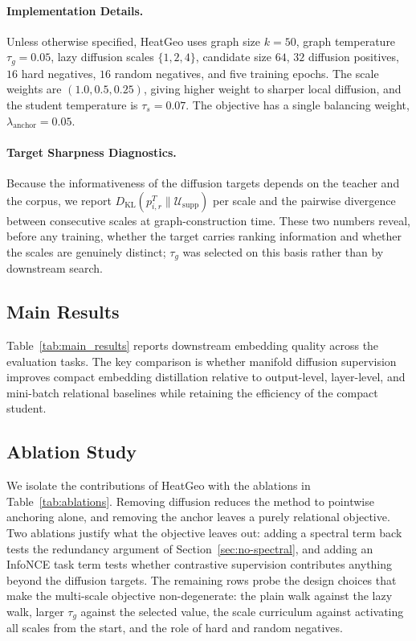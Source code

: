 \paragraph{Implementation Details.}
Unless otherwise specified, HeatGeo uses graph size $k=50$, graph temperature $\tau_g=0.05$, lazy diffusion scales $\{1,2,4\}$, candidate size $64$, $32$ diffusion positives, $16$ hard negatives, $16$ random negatives, and five training epochs. The scale weights are $(1.0,0.5,0.25)$, giving higher weight to sharper local diffusion, and the student temperature is $\tau_s=0.07$. The objective has a single balancing weight, $\lambda_{\mathrm{anchor}}=0.05$.

\paragraph{Target Sharpness Diagnostics.}
Because the informativeness of the diffusion targets depends on the teacher and the corpus, we report $D_{\mathrm{KL}}(p_{i,r}^T\|\mathcal{U}_{\mathrm{supp}})$ per scale and the pairwise divergence between consecutive scales at graph-construction time. These two numbers reveal, before any training, whether the target carries ranking information and whether the scales are genuinely distinct; $\tau_g$ was selected on this basis rather than by downstream search.

\subsection{Main Results}

Table~\ref{tab:main_results} reports downstream embedding quality across the evaluation tasks. The key comparison is whether manifold diffusion supervision improves compact embedding distillation relative to output-level, layer-level, and mini-batch relational baselines while retaining the efficiency of the compact student.



\subsection{Ablation Study}

We isolate the contributions of HeatGeo with the ablations in Table~\ref{tab:ablations}. Removing diffusion reduces the method to pointwise anchoring alone, and removing the anchor leaves a purely relational objective. Two ablations justify what the objective leaves out: adding a spectral term back tests the redundancy argument of Section~\ref{sec:no-spectral}, and adding an InfoNCE task term tests whether contrastive supervision contributes anything beyond the diffusion targets. The remaining rows probe the design choices that make the multi-scale objective non-degenerate: the plain walk against the lazy walk, larger $\tau_g$ against the selected value, the scale curriculum against activating all scales from the start, and the role of hard and random negatives.


